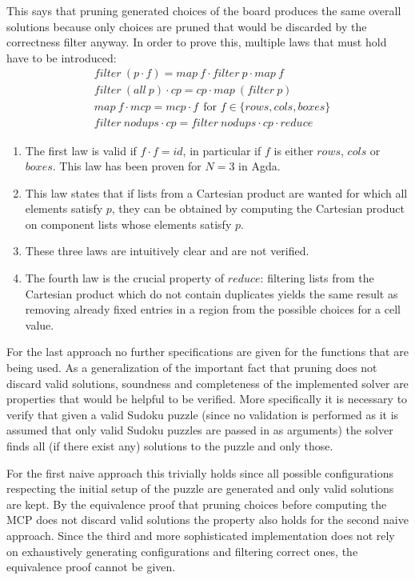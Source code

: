 \documentclass[a4paper,11pt]{article}
\begin{document}
This says that pruning generated choices of the board produces the same overall solutions because only choices are pruned that would be discarded by the correctness filter anyway. In order to prove this, multiple laws that must hold have to be introduced:
\begin{align}
  &filter~(p \cdot f) = map~f \cdot filter~p \cdot map~f\\
  &filter~(all~p) \cdot cp = cp \cdot map~(filter~p)\\
  &map~f \cdot mcp = mcp \cdot f~~\text{for \(f \in \{rows,cols,boxes\}\)}\\
  &filter~nodups \cdot cp = filter~nodups \cdot cp \cdot reduce
\end{align}

\begin{enumerate}
  \item The first law is valid if \(f \cdot f = id\), in particular if \(f\) is either \(rows\), \(cols\) or \(boxes\). This law has been proven for \(N = 3\) in Agda.
  \item This law states that if lists from a Cartesian product are wanted for which all elements satisfy \(p\), they can be obtained by computing the Cartesian product on component lists whose elements satisfy \(p\). 
  \item These three laws are intuitively clear and are not verified.
  \item The fourth law is the crucial property of \(reduce\): filtering lists from the Cartesian product which do not contain duplicates yields the same result as removing already fixed entries in a region from the possible choices for a cell value. 
\end{enumerate}

For the last approach no further specifications are given for the functions that are being used. As a generalization of the important fact that pruning does not discard valid solutions, soundness and completeness of the implemented solver are properties that would be helpful to be verified. More specifically it is necessary to verify that given a valid Sudoku puzzle (since no validation is performed as it is assumed that only valid Sudoku puzzles are passed in as arguments) the solver finds all (if there exist any) solutions to the puzzle and only those. 

For the first naive approach this trivially holds since all possible configurations respecting the initial setup of the puzzle are generated and only valid solutions are kept. By the equivalence proof that pruning choices before computing the MCP does not discard valid solutions the property also holds for the second naive approach. Since the third and more sophisticated implementation does not rely on exhaustively generating configurations and filtering correct ones, the equivalence proof cannot be given.
\end{document}
